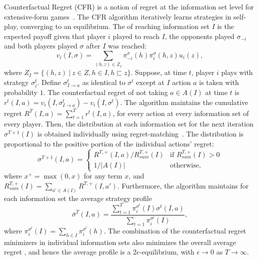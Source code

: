 \documentclass[letterpaper]{article}
\newcommand{\defword}[1]{\textbf{\boldmath{#1}}}
\begin{document}
Counterfactual Regret (CFR) is a notion of regret at the information set level for extensive-form games~\cite{CFR}. 
The CFR algorithm iteratively learns strategies in self-play, converging to an equilibrium. 
The \defword{counterfactual value} of reaching information set $I$ is the expected payoff given that player $i$ played to reach $I$, the opponents played 
$\sigma_{-i}$ and both players played $\sigma$ after $I$ was reached:
\begin{equation}
\label{eq:cfv}
v_i(I,\sigma) = \sum_{(h,z) \in Z_I} \pi^{\sigma}_{-i}(h) \pi^{\sigma}_{i}(h,z) u_i(z), 
\end{equation}
where $Z_I = \{ (h,z)~|~z \in Z, h \in I, h \sqsubset z \}$.
Suppose, at time $t$, player $i$ plays with strategy $\sigma^t_i$. 
Define $\sigma^t_{I \rightarrow a}$ as identical to $\sigma^t$ except at $I$ action $a$ is taken with probability $1$. 
The counterfactual regret of not taking $a \in A(I)$ at time $t$ is $r^t(I,a) = v_i(I,\sigma^t_{I \rightarrow a}) - v_i(I,\sigma^t)$. 
The algorithm maintains the cumulative regret $R^T(I,a) = \sum_{t=1}^T r^t(I,a)$, for every action at every information set of every player. 
Then, the distribution at each information set for the next iteration $\sigma^{T+1}(I)$ is obtained individually using 
regret-matching~\cite{Hart00}. The distribution is proportional to the positive portion of the individual actions' regret:
\begin{equation*}
\label{eq:rm}
\sigma^{T+1}(I,a) = \left\{
\begin{array}{ll}
R^{T,+}(I,a) / R^{T,+}_{sum}(I) & \mbox{if } R^{T,+}_{sum}(I) > 0 \\ 
1 / |A(I)|                   & \mbox{otherwise,}
\end{array} \right.
\end{equation*}
where $x^+ = \max(0,x)$ for any term $x$, and $R^{T,+}_{sum}(I) = \sum_{a' \in A(I)} R^{T,+}(I,a')$. Furthermore, the algorithm maintains for each information set the average strategy profile
\begin{equation}
\bar{\sigma}^T(I,a) = \frac{\sum_{t=1}^T \pi^{\sigma^t}_i(I) \sigma^t(I,a)}{\sum_{t=1} \pi^{\sigma^t}_i(I)}, 
\end{equation}
where $\pi^{\sigma^t}_i(I) = \sum_{h \in I}\pi^{\sigma^t}_i(h)$.
The combination of the counterfactual regret minimizers in individual information sets also minimizes the overall average regret \cite{CFR}, and hence the average profile is a $2\epsilon$-equilibrium, with $\epsilon \rightarrow 0$
as $T \rightarrow \infty$.
\end{document}

